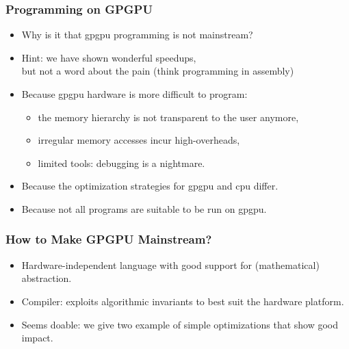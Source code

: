 \documentclass{beamer}
\begin{document}
\begin{frame}
  \frametitle{Programming on GPGPU}

\begin{itemize}
    \item Why is it that {\sc gpgpu} programming is not mainstream? \bigskip %

    \item Hint: we have shown wonderful speedups, \\ but not a word about the pain (think programming in assembly)  \bigskip %

    \item Because {\sc gpgpu} hardware is more difficult to program: \smallskip
        \begin{itemize}
            \item the memory hierarchy is not transparent to the user anymore, \smallskip
            \item irregular memory accesses incur high-overheads,              \smallskip
            \item limited tools: debugging is a nightmare.                     \bigskip    %
        \end{itemize}  

    \item Because the optimization strategies for {\sc gpgpu} and {\sc cpu} differ. \bigskip %

    \item Because not all programs are suitable to be run on {\sc gpgpu}.
\end{itemize}

\end{frame}

\begin{frame}
  \frametitle{How to Make GPGPU Mainstream?}

\begin{itemize}
    \item Hardware-independent language with good support for (mathematical) abstraction. \bigskip %

    \item Compiler: exploits algorithmic invariants to best suit the hardware platform.  \bigskip %

    \item Seems doable: we give two example of simple optimizations that show good impact.
\end{itemize}

\end{frame}
\end{document}

